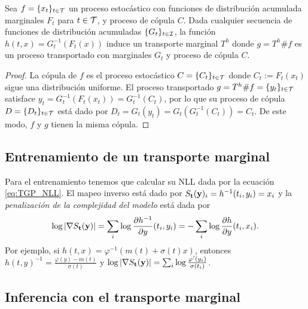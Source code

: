 \begin{proposition}
	Sea \(f= \{x_t\}_{t\in\mathcal{T}}\) un proceso estocástico con funciones de distribución acumulada marginales \(F_t\) para \(t \in \mathcal{T}\), y proceso de cópula \(C\). Dada cualquier secuencia de funciones de distribución acumuladas \(\{G_t\}_{t \in \mathcal{I}}\), la función \(h(t,x) = G_t^{-1}(F_t(x))\) induce un transporte marginal \(T^h\) donde \(g = T^h\#f\) es un proceso transportado con marginales \(G_t\) y proceso de cópula \(C\).
	\begin{proof}
		La cópula de \(f\) es el proceso estocástico \(C = \{C_t\}_{t\in\mathcal{T}}\) donde \(C_t := F_t(x_t)\) sigue una distribución uniforme. El proceso transportado \(g = T^h\#f = \{y_t\}_{t\in\mathcal{T}}\) satisface \(y_t = G_t^{-1}(F_t(x_t)) = G_t^{-1}(C_t)\), por lo que su proceso de cópula \(D = \{D_t\}_{t\in\mathcal{T}}\) está dado por \(D_t = G_t(y_t) = G_t(G_t^{-1}(C_t)) = C_t\). De este modo, \(f\) y \(g\) tienen la misma cópula.
	\end{proof}
\end{proposition}


\subsection{Entrenamiento de un transporte marginal}

Para el entrenamiento tenemos que calcular su NLL dada por la ecuación \eqref{eq:TGP_NLL}. El mapeo inverso está dado por \(S_{\mathbf{t}}(\mathbf{y})_{i} = h^{-1}(t_i, y_i) = x_i\) y la \emph{penalización de la complejidad del modelo} está dada por
\begin{align}
\log|\nabla S_{\mathbf{t}}(\mathbf{y})| = \sum_{i} \log \frac{\partial h^{-1}}{\partial  y}(t_i, y_i)=- \sum_{i} \log \frac{\partial h}{\partial  y}(t_i, x_i).
\end{align}
Por ejemplo, si \(h(t,x) = \varphi^{-1}\left(m(t)+\sigma(t)x\right)\), entonces \(h(t,y)^{-1} = \frac{\varphi(y) -  m(t)}{\sigma(t)}\) y \(\log|\nabla S_{\mathbf{t}}(\mathbf{y})| = \sum_{i} \log \frac{\varphi'(y_i)}{\sigma(t_i)}\).

\subsection{Inferencia con el transporte marginal}

